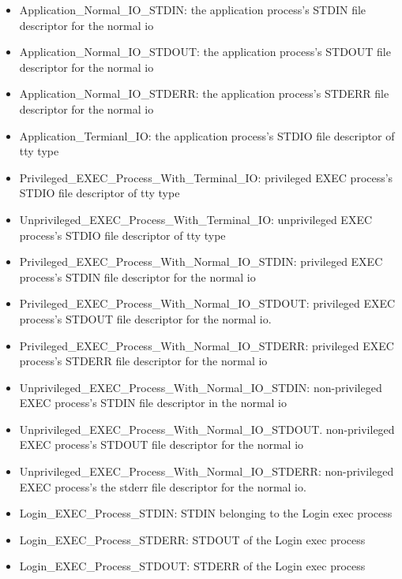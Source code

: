 \begin{itemize} \label{dolist}
    \item Application\_Normal\_IO\_STDIN: the application process's STDIN file descriptor for the normal io 
    \item Application\_Normal\_IO\_STDOUT: the application process's STDOUT file descriptor for the normal io 
    \item Application\_Normal\_IO\_STDERR: the application process's STDERR file descriptor for the normal io 
    \item Application\_Termianl\_IO:  the application process's STDIO file descriptor of tty type 
    \item Privileged\_EXEC\_Process\_With\_Terminal\_IO: privileged EXEC process's STDIO file descriptor of tty type
    \item Unprivileged\_EXEC\_Process\_With\_Terminal\_IO: unprivileged EXEC process's STDIO file descriptor of tty type 
    \item Privileged\_EXEC\_Process\_With\_Normal\_IO\_STDIN: privileged EXEC process's STDIN file descriptor for the normal io 
    \item Privileged\_EXEC\_Process\_With\_Normal\_IO\_STDOUT: privileged EXEC process's STDOUT file descriptor for the normal io.
    \item Privileged\_EXEC\_Process\_With\_Normal\_IO\_STDERR: privileged EXEC process's STDERR file descriptor for the normal io
    \item Unprivileged\_EXEC\_Process\_With\_Normal\_IO\_STDIN: non-privileged EXEC process's STDIN file descriptor in the normal io 
    \item Unprivileged\_EXEC\_Process\_With\_Normal\_IO\_STDOUT. non-privileged EXEC process's STDOUT file descriptor for the normal io
    \item Unprivileged\_EXEC\_Process\_With\_Normal\_IO\_STDERR: non-privileged EXEC process's the stderr file descriptor for the normal io.
    \item Login\_EXEC\_Process\_STDIN: STDIN belonging to the Login exec process
    \item Login\_EXEC\_Process\_STDERR: STDOUT of the Login exec process
    \item Login\_EXEC\_Process\_STDOUT: STDERR of the Login exec process
    
\end{itemize}

